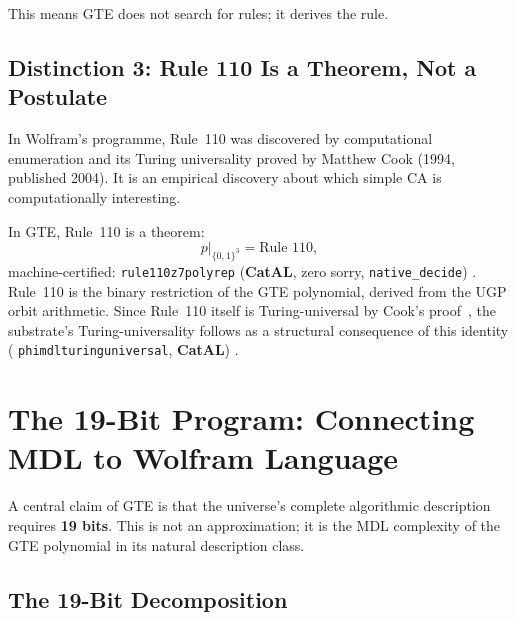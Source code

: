 \documentclass[11pt,a4paper]{article}
\newcommand{\lean}[1]{%
  \penalty-100
  \begingroup\def\_{\textunderscore\allowbreak}\texttt{#1}\endgroup}
\newcommand{\CatAL}{\textbf{CatAL}}
\begin{document}
This means GTE does not search for rules; it derives the rule.

\subsection{Distinction 3: Rule 110 Is a Theorem, Not a Postulate}

In Wolfram's programme, Rule~110 was discovered by computational enumeration and
its Turing universality proved by Matthew Cook (1994, published 2004).  It is an
empirical discovery about which simple CA is computationally interesting.

In GTE, Rule~110 is a theorem:
\begin{equation*}
  p\big|_{\{0,1\}^3} = \text{Rule~110},
\end{equation*}
machine-certified: \lean{rule110\_z7\_poly\_rep} (\CatAL, zero sorry,
\texttt{native\_decide}) \cite{SpivackGTEPolynomialWolfram}.  Rule~110 is the
binary restriction of the GTE polynomial, derived from the UGP orbit arithmetic.
Since Rule~110 itself is Turing-universal by Cook's proof~\cite{Cook2004}, the
substrate's Turing-universality follows as a structural consequence of this
identity (\lean{phimdl\_turing\_universal}, \CatAL)
\cite{SpivackCompUniversality}.

\section{The 19-Bit Program: Connecting MDL to Wolfram Language}
\label{sec:19bit}

A central claim of GTE is that the universe's complete algorithmic description
requires \textbf{19 bits}.  This is not an approximation; it is the MDL complexity
of the GTE polynomial in its natural description class.

\subsection{The 19-Bit Decomposition}
\end{document}
